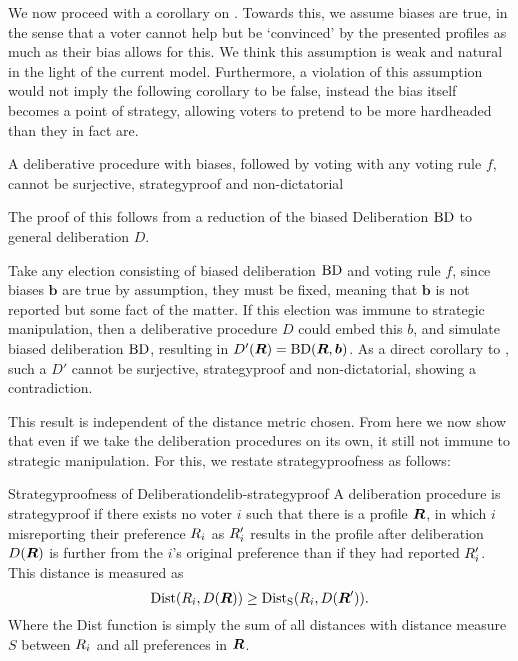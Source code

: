 We now proceed with a corollary on
. Towards this, we assume biases
are true, in the sense that a voter cannot help but be `convinced' by
the presented profiles as much as their bias allows for this. We think
this assumption is weak and natural in the light of the current
model. Furthermore, a violation of this assumption would not imply the
following corollary to be false, instead the bias itself becomes a
point of strategy, allowing voters to pretend to be more hardheaded
than they in fact are.

\begin{corollary} A deliberative procedure with biases, followed by
	voting with any voting rule $f$, cannot be surjective,
	strategyproof and non-dictatorial

	\label{corollary:biased-delib} \end{corollary}

The proof of this follows from a reduction of the biased Deliberation
$\operatorname{BD}$ to general deliberation $D$.

\begin{proofc}{} Take any election consisting of biased deliberation
	$\operatorname{BD}$ and voting rule $f$, since biases
	$\boldsymbol{b}$ are true by assumption, they must be fixed,
	meaning that $\boldsymbol{b}$ is not reported but some fact of
	the matter. If this election was immune to strategic
	manipulation, then a deliberative procedure $D$ could embed
	this $b$, and simulate biased deliberation
	$\operatorname{BD}$, resulting in $D'(\boldsymbol{R}) =
		\operatorname{BD}(\boldsymbol{R}, \boldsymbol{b})$. As a
	direct corollary to ,
	such a $D'$ cannot be surjective, strategyproof and
	non-dictatorial, showing a contradiction. \end{proofc}

This result is independent of the distance metric chosen. From
here we now show that even if we take the deliberation
procedures on its own, it still not immune to strategic
manipulation. For this, we restate strategyproofness as follows:

\begin{definition}{Strategyproofness of
		Deliberation}{delib-strategyproof} A deliberation
	procedure is strategyproof if there exists no voter $i$
	such that there is a profile $\boldsymbol{R}$, in which
	$i$ misreporting their preference $R_{i}$ as
	$R_{i}'$ results in the profile after
	deliberation $D(\boldsymbol{R})$ is further from the
	$i$'s original preference than if they had reported
	$R_{i}'$. This distance is measured as
	\[\operatorname{Dist}(R_{i},
		D(\boldsymbol{R})) \geq
		\operatorname{Dist}_{\text{S}}(R_{i}, D(\boldsymbol{R}')).\]
	Where the Dist function is simply the sum of all distances with distance measure $S$
	between $R_i$ and all preferences in
	$\boldsymbol{R}$. \end{definition}

